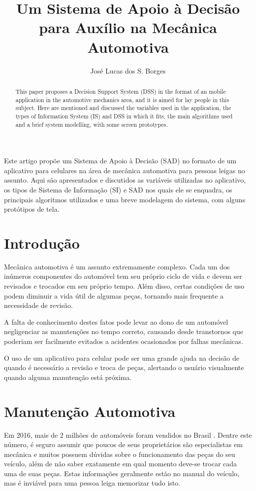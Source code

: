 \documentclass[12pt]{article}
\title{Um Sistema de Apoio à Decisão para Auxílio na Mecânica Automotiva}
\author{José Lucas dos S. Borges{\inst1}}
\begin{document}
\maketitle

\begin{abstract}
    This paper proposes a Decision Support System (DSS) in the format of an
    mobile application in the automotive mechanics area, and it is aimed for
    lay people in this subject. Here are mentioned and discussed the variables
    used in the application, the types of Information System (IS) and DSS in
    which it fits, the main algorithms used and a brief system modelling, with
    some screen prototypes.
\end{abstract}

\begin{resumo}
    Este artigo propõe um Sistema de Apoio à Decisão (SAD) no formato de um
    aplicativo para celulares na área de mecânica automotiva para pessoas leigas
    no assunto. Aqui são apresentados e discutidos as variáveis utilizadas no
    aplicativo, os tipos de Sistema de Informação (SI) e SAD nos quais ele se
    enquadra, os principais algoritmos utilizados e uma breve modelagem do
    sistema, com alguns protótipos de tela.
\end{resumo}


\section{Introdução} \label{sec:introducao}

Mecânica automotiva é um assunto extremamente complexo. Cada um dos inúmeros
componentes do automóvel tem seu próprio ciclo de vida e devem ser revisados
e trocados em seu próprio tempo. Além disso, certas condições de uso podem
diminuir a vida útil de algumas peças, tornando mais frequente a necessidade
de revisão.

A falta de conhecimento destes fatos pode levar ao dono de um automóvel
negligenciar as manutenções no tempo correto, causando desde transtornos
que poderiam ser facilmente evitados a acidentes ocasionados por falhas
mecânicas.

O uso de um aplicativo para celular pode ser uma grande ajuda na decisão de
quando é necessário a revisão e troca de peças, alertando o usuário
visualmente quando alguma manutenção está próxima.

\section{Manutenção Automotiva} \label{sec:manutencao}
Em 2016, mais de 2 milhões de automóveis foram vendidos no Brasil
\cite{fenabrave}. Dentre este número, é seguro assumir que poucos de seus
proprietários são especialistas em mecânica e muitos possuem dúvidas sobre o
funcionamento das peças do seu veículo, além de não saber exatamente em qual
momento deve-se trocar cada uma de suas peças. Estas informações geralmente
estão no manual do veículo, mas é inviável para uma pessoa leiga memorizar
tudo isto.
\end{document}
